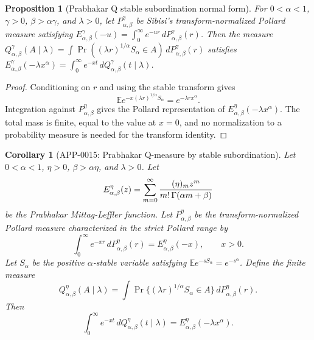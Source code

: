 \documentclass[11pt]{article}
\numberwithin{equation}{section}
\newtheorem{proposition}[theorem]{Proposition}
\newtheorem{corollary}[theorem]{Corollary}
\theoremstyle{definition}
\theoremstyle{remark}
\newcommand{\1}{\mathbf 1}
\begin{document}
\begin{proposition}[Prabhakar Q stable subordination normal form]
\label{res:prabhakar-q-stable-subordination-normal-form}
For \(0<\alpha<1\), \(\gamma>0\), \(\beta>\alpha\gamma\), and \(\lambda>0\), let \(P^\gamma_{\alpha,\beta}\) be Sibisi's transform-normalized Pollard measure satisfying \(E^\gamma_{\alpha,\beta}(-u)=\int_0^\infty e^{-ur}\,dP^\gamma_{\alpha,\beta}(r)\). Then the measure \(Q^\gamma_{\alpha,\beta}(A\mid\lambda)=\int\Pr((\lambda r)^{1/\alpha}S_\alpha\in A)\,dP^\gamma_{\alpha,\beta}(r)\) satisfies \(E^\gamma_{\alpha,\beta}(-\lambda x^\alpha)=\int_0^\infty e^{-xt}\,dQ^\gamma_{\alpha,\beta}(t\mid\lambda)\).
\end{proposition}

\begin{proof}
Conditioning on \(r\) and using the stable transform gives
\[
 \mathbb E e^{-x(\lambda r)^{1/\alpha}S_\alpha}=e^{-\lambda r x^\alpha}.
\]
Integration against \(P_{\alpha,\beta}^{\eta}\) gives the Pollard
representation of \(E_{\alpha,\beta}^{\eta}(-\lambda x^\alpha)\).  The total
mass is finite, equal to the value at \(x=0\), and no normalization to a
probability measure is needed for the transform identity.
\end{proof}

\begin{corollary}[APP-0015: Prabhakar Q-measure by stable subordination]
\label{thm:app15-prabhakar-subordination}
Let \(0<\alpha<1\), \(\eta>0\), \(\beta>\alpha\eta\), and \(\lambda>0\).
Let
\[
  E_{\alpha,\beta}^{\eta}(z)
  =\sum_{m=0}^{\infty}{(\eta)_m z^m\over m!\,\Gamma(\alpha m+\beta)}
\]
be the Prabhakar Mittag-Leffler function.  Let
\(P_{\alpha,\beta}^{\eta}\) be the transform-normalized Pollard measure
characterized in the strict Pollard range by
\[
  \int_0^\infty e^{-xr}\,dP_{\alpha,\beta}^{\eta}(r)
  =E_{\alpha,\beta}^{\eta}(-x),\qquad x>0.
\]
Let \(S_\alpha\) be the positive \(\alpha\)-stable variable satisfying
\(\mathbb E e^{-sS_\alpha}=e^{-s^\alpha}\).  Define the finite measure
\[
  Q_{\alpha,\beta}^{\eta}(A\mid\lambda)
  =\int \Pr\{(\lambda r)^{1/\alpha}S_\alpha\in A\}\,
       dP_{\alpha,\beta}^{\eta}(r).
\]
Then
\[
  \int_0^\infty e^{-xt}\,dQ_{\alpha,\beta}^{\eta}(t\mid\lambda)
  =E_{\alpha,\beta}^{\eta}(-\lambda x^\alpha).
\]


\end{corollary}
\end{document}
